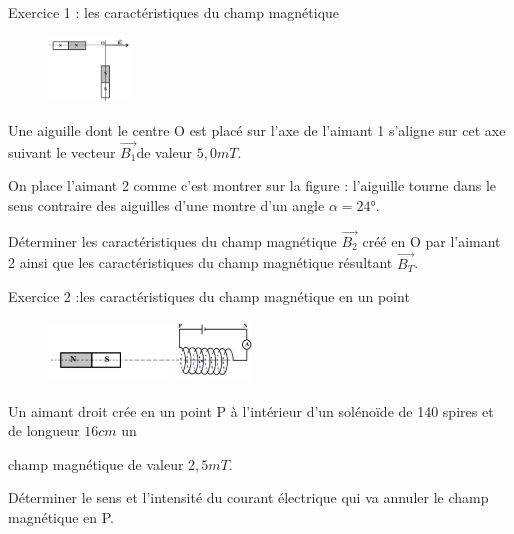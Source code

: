 \documentclass[12pt, french]{article}
\begin{document}
\begin{center}
\end{center}


   \begin{Box2}{Exercice 1 :  les caractéristiques du champ magnétique  }
\begin{figure}
  \begin{center}
     \includegraphics[width=0.2\textwidth]{./img/ex001.png}
  \end{center}
\end{figure}
      Une aiguille dont le centre O est placé sur l’axe de l’aimant 1 s’aligne sur cet axe suivant le vecteur $\vec{B_1}$de valeur $5,0 mT$. 

      On place l’aimant 2 comme c’est montrer sur la figure : l’aiguille tourne dans le sens
contraire des aiguilles d’une montre d’un angle $\alpha = 24$°.

Déterminer les caractéristiques du champ magnétique $\vec{B_2}$ créé en O par l’aimant 2 ainsi que les caractéristiques du champ magnétique résultant $\vec{B_T}$.

   \end{Box2}


\begin{Box2}{Exercice 2 :les caractéristiques du champ magnétique en un point  }
\begin{figure}
  \begin{center}
     \includegraphics[width=0.48\textwidth]{./img/ex02.png}
  \end{center}
\end{figure}

Un aimant droit crée en un point P à l’intérieur d’un solénoïde de 140 spires et de longueur $16 cm$ un

   champ magnétique de valeur $2,5 mT$. 

   Déterminer le sens et l’intensité du courant électrique qui va annuler
le champ magnétique en P.
\end{Box2}
\end{document}
